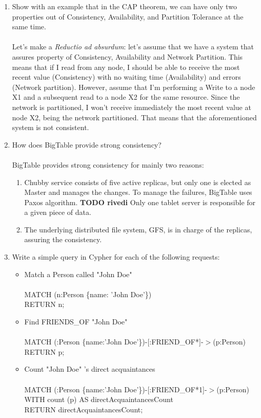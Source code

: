 \documentclass[]{report}
\begin{document}
\begin{enumerate}
 
 \item Show with an example that in the CAP theorem, we can have only two properties out of Consistency, Availability, and Partition Tolerance at the same time.\\\\
Let's make a \textit{Reductio ad absurdum}: let's assume that we have a system that assures property of Consistency, Availability and Network Partition. This means that if I read from any node, I should be able to receive the most recent value (Consistency) with no waiting time (Availability) and errors (Network partition). However, assume that I'm performing a Write to a node X1 and a subsequent read to a node X2 for the same resource. Since the network is partitioned, I won't receive immediately the most recent value at node X2, being the network partitioned. That means that the aforementioned system is not consistent.
 
 
 \item How does BigTable provide strong consistency?\\\\
 BigTable provides strong consistency for mainly two reasons:
\begin{enumerate}
    \item Chubby service consists of five active replicas, but only one is elected as Master and manages the changes. 
    To manage the failures, BigTable uses Paxos algorithm. \textbf{TODO rivedi}
    Only one tablet server is responsible for a given piece of data. 
    \item The underlying distributed file system, GFS, is in charge of the replicas, assuring the consistency.
\end{enumerate}
 
 \item Write a simple query in Cypher for each of the following requests:
 \begin{itemize}
    	\item Match a Person called "John Doe"\\\\
	MATCH (n:Person \{name: 'John Doe'\})\\
        RETURN n;\\
        \item Find FRIENDS\_OF "John Doe"\\\\
        MATCH (:Person \{name:'John Doe'\})-[:FRIEND\_OF*]-$>$(p:Person)\\
        RETURN p;\\
        \item Count "John Doe" 's direct acquaintances\\\\
     	MATCH (:Person \{name:'John Doe'\})-[:FRIEND\_OF*1]-$>$(p:Person)\\
	WITH count (p) AS directAcquaintancesCount\\
        RETURN directAcquaintancesCount;\\
  \end{itemize}

\end{enumerate}
\end{document}
